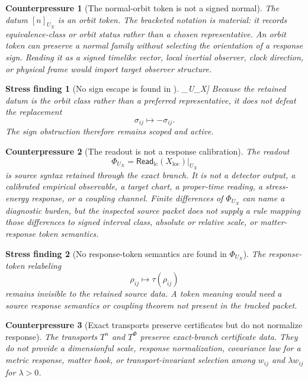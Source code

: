 \documentclass[11pt]{article}
\newcommand{\ReadLC}{\mathsf{Read}_{\mathrm{lc}}}
\newtheorem{counterpressure}{Counterpressure}
\newtheorem{stressfinding}{Stress finding}
\begin{document}
\begin{counterpressure}[The normal-orbit token is not a signed normal]
The datum \([n]_{U_X}\) is an orbit token. The bracketed notation is
material: it records equivalence-class or orbit status rather than a
chosen representative. An orbit token can preserve a normal family
without selecting the orientation of a response sign. Reading it as a
signed timelike vector, local inertial observer, clock direction, or
physical frame would import target observer structure.
\end{counterpressure}

\begin{stressfinding}[No sign escape is found in \([n]_{U_X}\)]
Because the retained datum is the orbit class rather than a preferred
representative, it does not defeat the replacement
\[
    \sigma_{ij}\mapsto -\sigma_{ij}.
\]
The sign obstruction therefore remains scoped and active.
\end{stressfinding}

\begin{counterpressure}[The readout is not a response calibration]
The readout
\[
    \Phi_{U_X}=\ReadLC(X_{\mathrm{loc}})|_{U_X}
\]
is source syntax retained through the exact branch. It is not a
detector output, a calibrated empirical observable, a target chart, a
proper-time reading, a stress-energy response, or a coupling channel.
Finite differences of \(\Phi_{U_X}\) can name a diagnostic burden, but
the inspected source packet does not supply a rule mapping those
differences to signed interval class, absolute or relative scale, or
matter-response token semantics.
\end{counterpressure}

\begin{stressfinding}[No response-token semantics are found in \(\Phi_{U_X}\)]
The response-token relabeling
\[
    \rho_{ij}\mapsto \tau(\rho_{ij})
\]
remains invisible to the retained source data. A token meaning would
need a source response semantics or coupling theorem not present in
the tracked packet.
\end{stressfinding}

\begin{counterpressure}[Exact transports preserve certificates but do not normalize response]
The transports \(T^n\) and \(T^\Phi\) preserve exact-branch
certificate data. They do not provide a dimensionful scale, response
normalization, covariance law for a metric response, matter hook, or
transport-invariant selection among \(w_{ij}\) and \(\lambda w_{ij}\)
for \(\lambda>0\).
\end{counterpressure}
\end{document}
